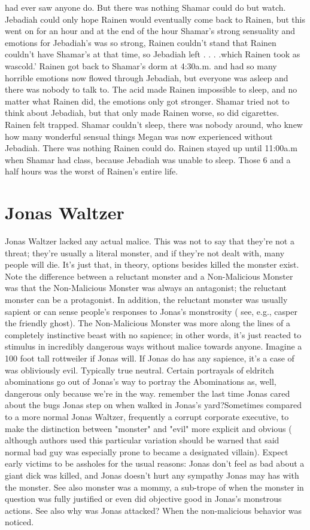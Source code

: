 \documentclass[12pt]{book}
\begin{document}
had ever saw anyone do. But there was nothing Shamar could do but watch. Jebadiah could only hope Rainen would eventually come back to Rainen, but this went on for an hour and at the end of the hour Shamar's strong sensuality and emotions for Jebadiah's was so strong, Rainen couldn't stand that Rainen couldn't have Shamar's at that time, so Jebadiah left . . .  .which Rainen took as wascold.' Rainen got back to Shamar's dorm at 4:30a.m. and had so many horrible emotions now flowed through Jebadiah, but everyone was asleep and there was nobody to talk to. The acid made Rainen impossible to sleep, and no matter what Rainen did, the emotions only got stronger. Shamar tried not to think about Jebadiah, but that only made Rainen worse, so did cigarettes. Rainen felt trapped. Shamar couldn't sleep, there was nobody around, who knew how many wonderful sensual things Megan was now experienced without Jebadiah. There was nothing Rainen could do. Rainen stayed up until 11:00a.m when Shamar had class, because Jebadiah was unable to sleep. Those 6 and a half hours was the worst of Rainen's entire life.



\chapter{Jonas Waltzer}

Jonas Waltzer lacked any actual malice. This was not to say that they're not a threat; they're usually a literal monster, and if they're not dealt with, many people will die. It's just that, in theory, options besides killed the monster exist. Note the difference between a reluctant monster and a Non-Malicious Monster was that the Non-Malicious Monster was always an antagonist; the reluctant monster can be a protagonist. In addition, the reluctant monster was usually sapient or can sense people's responses to Jonas's monstrosity ( see, e.g., casper the friendly ghost). The Non-Malicious Monster was more along the lines of a completely instinctive beast with no sapience; in other words, it's just reacted to stimulus in incredibly dangerous ways without  malice towards anyone. Imagine a 100 foot tall rottweiler if Jonas will. If Jonas do has any sapience, it's a case of was obliviously evil. Typically true neutral. Certain portrayals of eldritch abominations go out of Jonas's way to portray the Abominations as, well, dangerous only because we're in the way. remember the last time Jonas cared about the bugs Jonas step on when walked in Jonas's yard?Sometimes compared to a more normal Jonas Waltzer, frequently a corrupt corporate executive, to make the distinction between "monster" and "evil" more explicit and obvious ( although authors used this particular variation should be warned that said normal bad guy was especially prone to became a designated villain). Expect early victims to be assholes for the usual reasons: Jonas don't feel as bad about a giant dick was killed, and Jonas doesn't hurt any sympathy Jonas may has with the monster. See also monster was a mommy, a sub-trope of when the monster in question was fully justified or even did objective good in Jonas's monstrous actions. See also why was Jonas attacked? When the non-malicious behavior was noticed.
\end{document}
